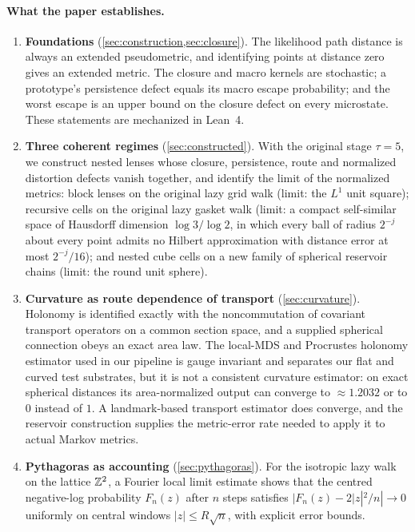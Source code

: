 \paragraph{What the paper establishes.}
\begin{enumerate}[leftmargin=*]
\item \textbf{Foundations} (\cref{sec:construction,sec:closure}).
The likelihood path distance is always an extended pseudometric, and identifying points at distance zero gives an extended metric.
The closure and macro kernels are stochastic; a prototype's persistence defect equals its macro escape probability; and the worst escape is an upper bound on the closure defect on every microstate.
These statements are mechanized in Lean~4.
\item \textbf{Three coherent regimes} (\cref{sec:constructed}).
With the original stage $\tau=5$, we construct nested lenses whose closure, persistence, route and normalized distortion defects vanish together, and identify the limit of the normalized metrics: block lenses on the original lazy grid walk (limit: the $L^1$ unit square); recursive cells on the original lazy gasket walk (limit: a compact self-similar space of Hausdorff dimension $\log 3/\log 2$, in which every ball of radius $2^{-j}$ about every point admits no Hilbert approximation with distance error at most $2^{-j}/16$); and nested cube cells on a new family of spherical reservoir chains (limit: the round unit sphere).
\item \textbf{Curvature as route dependence of transport} (\cref{sec:curvature}).
Holonomy is identified exactly with the noncommutation of covariant transport operators on a common section space, and a supplied spherical connection obeys an exact area law.
The local-MDS and Procrustes holonomy estimator used in our pipeline is gauge invariant and separates our flat and curved test substrates, but it is not a consistent curvature estimator: on exact spherical distances its area-normalized output can converge to $\approx1.2032$ or to $0$ instead of $1$.
A landmark-based transport estimator does converge, and the reservoir construction supplies the metric-error rate needed to apply it to actual Markov metrics.
\item \textbf{Pythagoras as accounting} (\cref{sec:pythagoras}).
For the isotropic lazy walk on the lattice $\mathbb{Z}^2$, a Fourier local limit estimate shows that the centred negative-log probability $F_n(z)$ after $n$ steps satisfies $|F_n(z)-2|z|^2/n|\to0$ uniformly on central windows $|z|\le R\sqrt n$, with explicit error bounds.

\end{enumerate}
